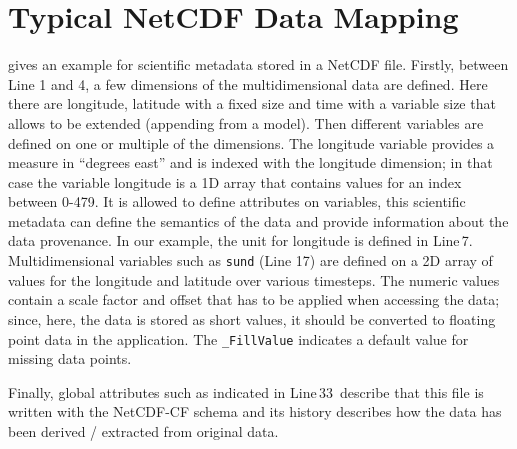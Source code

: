 \chapter{Typical NetCDF Data Mapping}
\label{sec:netcdfDataMapping}

 gives an example for scientific metadata stored in a NetCDF file.
Firstly, between Line 1 and 4, a few dimensions of the multidimensional data are defined.
Here there are longitude, latitude with a fixed size and time with a variable size that allows to be extended (appending from a model).
Then different variables are defined on one or multiple of the dimensions.
The longitude variable provides a measure in “degrees east” and is indexed with the longitude dimension; in that case the variable longitude is a 1D array that contains values for an index between 0-479.
It is allowed to define attributes on variables, this scientific metadata can define the semantics of the data and provide information about the data provenance.
In our example, the unit for longitude is defined in Line\,7.
Multidimensional variables such as \texttt{sund} (Line 17) are defined on a 2D array of values for the longitude and latitude over various timesteps.
The numeric values contain a scale factor and offset that has to be applied when accessing the data; since, here, the data is stored as short values, it should be converted to floating point data in the application.
The \texttt{\_FillValue} indicates a default value for missing data points.

Finally, global attributes such as indicated in Line\,33\, describe that this file is written with the NetCDF-CF schema and its history describes how the data has been derived / extracted from original data.

